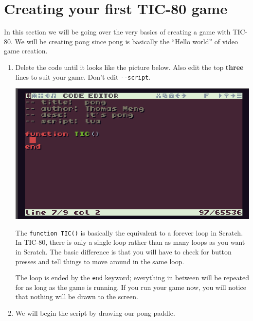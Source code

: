\documentclass[10pt, twocolumn]{article}
\begin{document}
\section{Creating your first TIC-80 game}
In this section we will be going over the very basics of creating a game with TIC-80. We will be creating pong since pong is basically the ``Hello world'' of video game creation.
\begin{enumerate}
	\item Delete the code until it looks like the picture below. Also edit the top \textbf{three} lines to suit your game. Don't edit \lstinline{--script}. 
	
	\includegraphics[width=1\linewidth]{game_base.png}
	
	The \lstinline{function TIC()} is basically the equivalent to a forever loop in Scratch. In TIC-80, there is only a single loop rather than as many loops as you want in Scratch. The basic difference is that you will have to check for button presses and tell things to move around in the same loop.
	
	The loop is ended by the \lstinline{end} keyword; everything in between will be repeated for as long as the game is running. If you run your game now, you will notice that nothing will be drawn to the screen.
	\item We will begin the script by drawing our pong paddle.
\end{enumerate}
\end{document}

